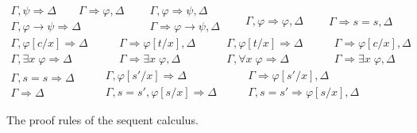 \documentclass[a4paper,UKenglish]{lipics}
\begin{document}
\begin{figure}[t]
\begin{displaymath}
\end{displaymath}
\begin{displaymath}
\begin{array}{c}
\Gamma, \psi \Longrightarrow \Delta \qquad \Gamma \Longrightarrow \varphi, \Delta \\ \hline
\Gamma, \varphi \to \psi \Longrightarrow \Delta
\end{array}
\quad\enspace
\begin{array}{c}
\Gamma, \varphi \Longrightarrow \psi, \Delta \\ \hline
\Gamma \Longrightarrow \varphi \to \psi, \Delta
\end{array}
\quad\enspace
\begin{array}{c}
\qquad \\ \hline
\Gamma, \varphi \Longrightarrow \varphi, \Delta
\end{array}
\quad\enspace
\begin{array}{c}
\qquad \\ \hline
\Gamma \Longrightarrow s=s, \Delta
\end{array}
\end{displaymath}
\begin{displaymath}
\begin{array}{c}
\Gamma, \varphi[c/x] \Longrightarrow \Delta \\ \hline
\Gamma, \exists x\;\varphi \Longrightarrow \Delta
\end{array}
\qquad
\begin{array}{c}
\Gamma \Longrightarrow \varphi[t/x], \Delta \\ \hline
\Gamma \Longrightarrow \exists x\;\varphi, \Delta
\end{array}
\qquad
\begin{array}{c}
\Gamma, \varphi[t/x] \Longrightarrow \Delta \\ \hline
\Gamma, \forall x\;\varphi \Longrightarrow \Delta
\end{array}
\qquad
\begin{array}{c}
\Gamma \Longrightarrow \varphi[c/x], \Delta \\ \hline
\Gamma \Longrightarrow \exists x\;\varphi, \Delta
\end{array} 
\end{displaymath}
\begin{displaymath}
\begin{array}{c}
\Gamma, s=s \Longrightarrow \Delta \\ \hline
\Gamma \Longrightarrow \Delta
\end{array}
\qquad
\begin{array}{c}
\Gamma, \varphi[s'/x] \Longrightarrow \Delta \\ \hline
\Gamma, s=s', \varphi[s/x] \Longrightarrow \Delta
\end{array}
\qquad
\begin{array}{c}
\Gamma \Longrightarrow \varphi[s'/x], \Delta \\ \hline
\Gamma, s=s' \Longrightarrow \varphi[s/x], \Delta
\end{array}
\end{displaymath}
\caption{The proof rules of the sequent calculus.}
\label{fig:rules} 
\end{figure}
\end{document}
